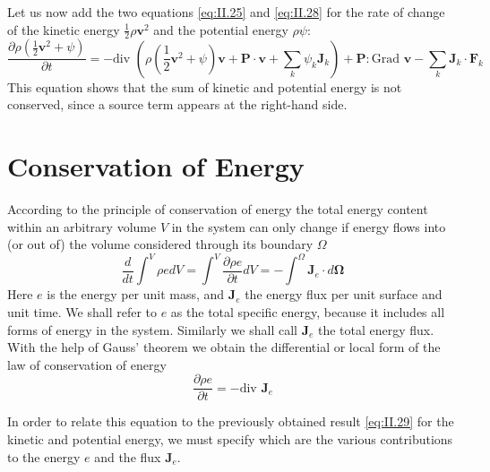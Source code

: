 Let us now add the two equations \eqref{eq:II.25} and \eqref{eq:II.28} for the rate of change
of the kinetic energy $\frac{1}{2} \rho \bm{v}^2$ and the potential energy $\rho \psi$:
\begin{equation}
\frac{\partial \rho \left(\frac{1}{2} \bm{v}^2 + \psi \right)}{\partial t} 
= 
- \textrm{div } \left( \rho \left( \frac{1}{2} \bm{v}^2 + \psi \right) \bm{v} + \bm{P} \cdot \bm{v} + \sum_{k} \psi_k \bm{J}_k \right) 
+
\bm{P} : \textrm{Grad } \bm{v}
- 
\sum_{k} \bm{J}_k \cdot \bm{F}_k
    \label{eq:II.29}
\end{equation}
This equation shows that the sum of kinetic and potential energy is
not conserved, since a source term appears at the right-hand side.

\section{Conservation of Energy}
According to the principle of conservation of energy the total energy
content within an arbitrary volume $V$ in the system can only change if
energy flows into (or out of) the volume considered through its
boundary $\Omega$
\begin{equation}
\frac{d}{dt} \int^V \rho e dV 
= 
\int^V \frac{\partial \rho e}{\partial t} dV 
=
- \int^{\Omega} \bm{J}_{e} \cdot d \bm{\Omega}
    \label{eq:II.30}
\end{equation}
Here $e$ is the energy per unit mass, and $\bm{J}_{e}$ the energy flux per unit surface and unit time. We shall refer to $e$ as the total specific energy, because it includes all forms of energy in the system. Similarly we shall call $\bm{J}_{e}$ the total energy flux. With the help of Gauss' theorem we obtain the differential or local form of the law of conservation of energy
\begin{equation}
\frac{\partial \rho e}{\partial t} = - \textrm{div } \bm{J}_e
    \label{eq:II.31}
\end{equation}

In order to relate this equation to the previously obtained result \eqref{eq:II.29} for the kinetic and potential energy, we must specify which are the various contributions to the energy $e$ and the flux $\bm{J}_e$.

